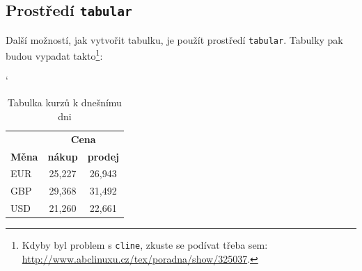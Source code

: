 \documentclass[a4paper, 11pt, final]{article}
\begin{document}
\subsection{Prostředí \texttt{tabular}}

Další možností, jak vytvořit tabulku, je použít prostředí \texttt{tabular}. Tabulky pak 
budou vypadat takto\footnote{Kdyby byl problem s \texttt{cline}, zkuste se podívat třeba sem: 
\url{http://www.abclinuxu.cz/tex/poradna/show/325037}.}:

\begin{table}[ht]
    \catcode`
    \centering
    \begin{tabular}{| l | c | c |}
        \hline
                                       & \multicolumn{2}{c|}{\textbf{Cena}} \\
        \cline{2-3}
        \textbf{Měna} & \textbf{nákup} & \textbf{prodej}  \\
        \hline
        EUR           & 25,227         & 26,943           \\
        \hline
        GBP           & 29,368         & 31,492           \\
        \hline
        USD           & 21,260         & 22,661           \\
        \hline
    \end{tabular}
    \caption{Tabulka kurzů k dnešnímu dni}
    \label{tab:today-rates}
\end{table}
\end{document}
